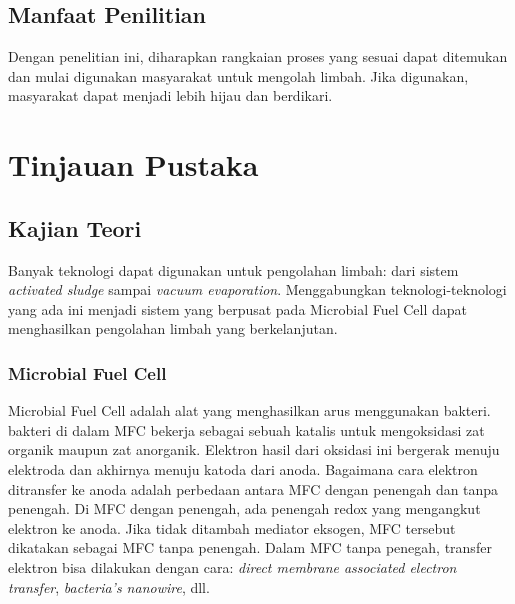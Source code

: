 \documentclass[10pt,a4paper,hidelinks]{article}
\begin{document}
	\subsection{Manfaat Penilitian}
	Dengan penelitian ini, diharapkan rangkaian proses yang sesuai dapat ditemukan dan mulai digunakan masyarakat untuk mengolah limbah. Jika digunakan, masyarakat dapat menjadi lebih hijau dan berdikari.
	\section{Tinjauan Pustaka}
    \subsection{Kajian Teori}
    Banyak teknologi dapat digunakan untuk pengolahan limbah: dari sistem  \textit{activated sludge} sampai \textit{vacuum evaporation}. Menggabungkan teknologi-teknologi yang ada ini menjadi sistem yang berpusat pada Microbial Fuel Cell dapat menghasilkan pengolahan limbah yang berkelanjutan.
    \subsubsection{Microbial Fuel Cell}
    Microbial Fuel Cell adalah alat yang menghasilkan arus menggunakan bakteri. bakteri di dalam MFC bekerja sebagai sebuah katalis untuk mengoksidasi zat organik maupun zat anorganik. Elektron hasil dari oksidasi ini bergerak menuju elektroda dan akhirnya menuju katoda dari anoda. Bagaimana cara elektron ditransfer ke anoda adalah perbedaan antara MFC dengan penengah dan tanpa penengah. Di MFC dengan penengah, ada penengah redox yang mengangkut elektron ke anoda. Jika tidak ditambah mediator eksogen, MFC tersebut dikatakan sebagai MFC tanpa penengah. Dalam MFC tanpa penegah, transfer elektron bisa dilakukan dengan cara: \textit{direct membrane associated electron transfer}, \textit{bacteria's nanowire}, dll. 
\end{document}
